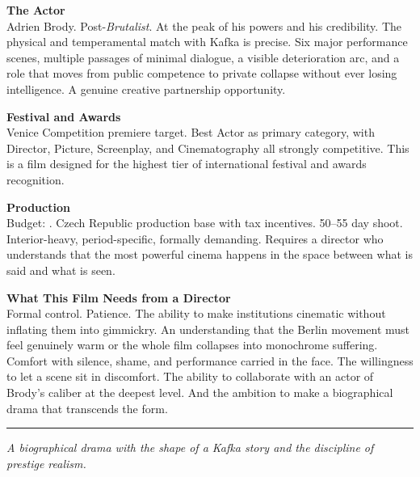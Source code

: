 \documentclass[11pt,letterpaper]{article}
\begin{document}
\vspace{2pt}

\textbf{The Actor}\\
Adrien Brody. Post-\textit{Brutalist}. At the peak of his powers and his credibility. The physical and temperamental match with Kafka is precise. Six major performance scenes, multiple passages of minimal dialogue, a visible deterioration arc, and a role that moves from public competence to private collapse without ever losing intelligence. A genuine creative partnership opportunity.

\vspace{2pt}

\textbf{Festival and Awards}\\
Venice Competition premiere target. Best Actor as primary category, with Director, Picture, Screenplay, and Cinematography all strongly competitive. This is a film designed for the highest tier of international festival and awards recognition.

\vspace{2pt}

\textbf{Production}\\
Budget: \filmbudgetrange. Czech Republic production base with tax incentives. 50--55 day shoot. Interior-heavy, period-specific, formally demanding. Requires a director who understands that the most powerful cinema happens in the space between what is said and what is seen.

\vspace{2pt}

\textbf{What This Film Needs from a Director}\\
Formal control. Patience. The ability to make institutions cinematic without inflating them into gimmickry. An understanding that the Berlin movement must feel genuinely warm or the whole film collapses into monochrome suffering. Comfort with silence, shame, and performance carried in the face. The willingness to let a scene sit in discomfort. The ability to collaborate with an actor of Brody's caliber at the deepest level. And the ambition to make a biographical drama that transcends the form.

\vspace{4pt}
\textcolor{sectionrule}{\rule{\textwidth}{0.5pt}}
\vspace{2pt}
\begin{center}
{\small\color{kafkalight}\textit{A biographical drama with the shape of a Kafka story and the discipline of prestige realism.}}
\end{center}
\end{document}

